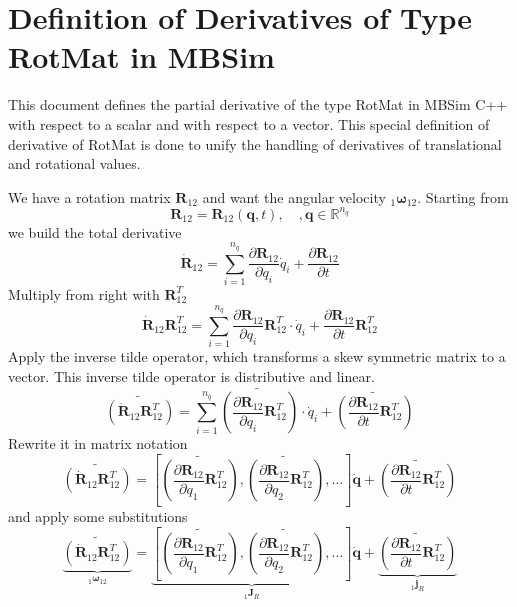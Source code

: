 \documentclass{article}
\newcommand{\bs}[1]{\boldsymbol #1}
\begin{document}
\section{Definition of Derivatives of Type RotMat in MBSim}

This document defines the partial derivative of the type RotMat in MBSim C++ with respect to a scalar and with respect to a vector. This special definition of derivative of RotMat is done to unify the handling of derivatives of translational and rotational values.
\vspace{1em}

We have a rotation matrix $\bs{R}_{12}$ and want the angular velocity $_1\bs{\omega}_{12}$. Starting from
\begin{equation}
\bs{R}_{12}=\bs{R}_{12}(\bs{q},t),\quad,\bs{q}\in\mathbb{R}^{n_q}
\end{equation}
we build the total derivative
\begin{equation}
\dot{\bs{R}}_{12}=\sum_{i=1}^{n_q} \frac{\partial \bs{R}_{12}}{\partial q_i}\dot{q}_i + \frac{\partial \bs{R}_{12}}{\partial t}
\end{equation}
Multiply from right with $\bs{R}_{12}^T$
\begin{equation}
\dot{\bs{R}}_{12}\bs{R}_{12}^T=\sum_{i=1}^{n_q} \frac{\partial \bs{R}_{12}}{\partial q_i}\bs{R}_{12}^T\cdot\dot{q}_i + \frac{\partial \bs{R}_{12}}{\partial t}\bs{R}_{12}^T
\end{equation}
Apply the inverse tilde operator, which transforms a skew symmetric matrix to a vector. This inverse tilde operator is distributive and linear.
\begin{equation}
\widetilde{\left(\dot{\bs{R}}_{12}\bs{R}_{12}^T\right)}=\sum_{i=1}^{n_q} \widetilde{\left(\frac{\partial \bs{R}_{12}}{\partial q_i}\bs{R}_{12}^T\right)}\cdot\dot{q}_i + \widetilde{\left(\frac{\partial \bs{R}_{12}}{\partial t}\bs{R}_{12}^T\right)}
\end{equation}
Rewrite it in matrix notation
\begin{equation}
\widetilde{\left(\dot{\bs{R}}_{12}\bs{R}_{12}^T\right)}=\left[\widetilde{\left(\frac{\partial \bs{R}_{12}}{\partial q_1}\bs{R}_{12}^T\right)},\widetilde{\left(\frac{\partial \bs{R}_{12}}{\partial q_2}\bs{R}_{12}^T\right)},\dots\right]\dot{\bs{q}} + \widetilde{\left(\frac{\partial \bs{R}_{12}}{\partial t}\bs{R}_{12}^T\right)}
\end{equation}
and apply some substitutions
\begin{equation}
\underbrace{\widetilde{\left(\dot{\bs{R}}_{12}\bs{R}_{12}^T\right)}}_{_1\bs{\omega}_{12}}=\underbrace{\left[\widetilde{\left(\frac{\partial \bs{R}_{12}}{\partial q_1}\bs{R}_{12}^T\right)},\widetilde{\left(\frac{\partial \bs{R}_{12}}{\partial q_2}\bs{R}_{12}^T\right)},\dots\right]}_{_1\bs{J}_R}\dot{\bs{q}} + \underbrace{\widetilde{\left(\frac{\partial \bs{R}_{12}}{\partial t}\bs{R}_{12}^T\right)}}_{_1\bs{j}_R}
\end{equation}
\end{document}
